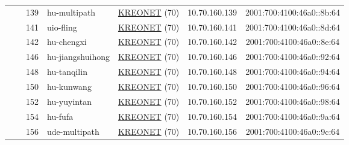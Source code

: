 \begin{small}
\begin{center}
\begin{longtable}{|c|c|c|c|c|c|c|c|}
  &  & \tiny{139} & \multicolumn{1}{|l|}{\tiny{hu-multipath}} & \multicolumn{2}{|c|}{\tiny{\href{http://www.kreonet.net}{KREONET} (70)}} & \tiny{10.70.160.139} & \tiny{2001:700:4100:46a0::8b:64} \\* \cline{3-3}\cline{4-4}\cline{5-5}\cline{6-6}\cline{7-7}\cline{8-8}
  &  & \tiny{141} & \multicolumn{1}{|l|}{\tiny{uio-fling}} & \multicolumn{2}{|c|}{\tiny{\href{http://www.kreonet.net}{KREONET} (70)}} & \tiny{10.70.160.141} & \tiny{2001:700:4100:46a0::8d:64} \\* \cline{3-3}\cline{4-4}\cline{5-5}\cline{6-6}\cline{7-7}\cline{8-8}
  &  & \tiny{142} & \multicolumn{1}{|l|}{\tiny{hu-chengxi}} & \multicolumn{2}{|c|}{\tiny{\href{http://www.kreonet.net}{KREONET} (70)}} & \tiny{10.70.160.142} & \tiny{2001:700:4100:46a0::8e:64} \\* \cline{3-3}\cline{4-4}\cline{5-5}\cline{6-6}\cline{7-7}\cline{8-8}
  &  & \tiny{146} & \multicolumn{1}{|l|}{\tiny{hu-jiangshuihong}} & \multicolumn{2}{|c|}{\tiny{\href{http://www.kreonet.net}{KREONET} (70)}} & \tiny{10.70.160.146} & \tiny{2001:700:4100:46a0::92:64} \\* \cline{3-3}\cline{4-4}\cline{5-5}\cline{6-6}\cline{7-7}\cline{8-8}
  &  & \tiny{148} & \multicolumn{1}{|l|}{\tiny{hu-tanqilin}} & \multicolumn{2}{|c|}{\tiny{\href{http://www.kreonet.net}{KREONET} (70)}} & \tiny{10.70.160.148} & \tiny{2001:700:4100:46a0::94:64} \\* \cline{3-3}\cline{4-4}\cline{5-5}\cline{6-6}\cline{7-7}\cline{8-8}
  &  & \tiny{150} & \multicolumn{1}{|l|}{\tiny{hu-kunwang}} & \multicolumn{2}{|c|}{\tiny{\href{http://www.kreonet.net}{KREONET} (70)}} & \tiny{10.70.160.150} & \tiny{2001:700:4100:46a0::96:64} \\* \cline{3-3}\cline{4-4}\cline{5-5}\cline{6-6}\cline{7-7}\cline{8-8}
  &  & \tiny{152} & \multicolumn{1}{|l|}{\tiny{hu-yuyintan}} & \multicolumn{2}{|c|}{\tiny{\href{http://www.kreonet.net}{KREONET} (70)}} & \tiny{10.70.160.152} & \tiny{2001:700:4100:46a0::98:64} \\* \cline{3-3}\cline{4-4}\cline{5-5}\cline{6-6}\cline{7-7}\cline{8-8}
  &  & \tiny{154} & \multicolumn{1}{|l|}{\tiny{hu-fufa}} & \multicolumn{2}{|c|}{\tiny{\href{http://www.kreonet.net}{KREONET} (70)}} & \tiny{10.70.160.154} & \tiny{2001:700:4100:46a0::9a:64} \\* \cline{3-3}\cline{4-4}\cline{5-5}\cline{6-6}\cline{7-7}\cline{8-8}
  &  & \tiny{156} & \multicolumn{1}{|l|}{\tiny{ude-multipath}} & \multicolumn{2}{|c|}{\tiny{\href{http://www.kreonet.net}{KREONET} (70)}} & \tiny{10.70.160.156} & \tiny{2001:700:4100:46a0::9c:64} \\* \cline{3-3}\cline{4-4}\cline{5-5}\cline{6-6}\cline{7-7}\cline{8-8}

\end{longtable}
\end{center}
\end{small}
